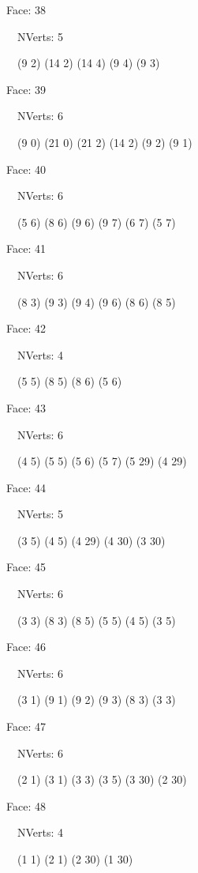 \documentclass{article}
\begin{document}
{\footnotesize 

Face: 38

\   \    NVerts: 5

 \   \   (9 2) (14 2) (14 4) (9 4) (9 3)}

{\footnotesize 

Face: 39

\   \    NVerts: 6

 \   \   (9 0) (21 0) (21 2) (14 2) (9 2) (9 1)}

{\footnotesize 

Face: 40

\   \    NVerts: 6

 \   \   (5 6) (8 6) (9 6) (9 7) (6 7) (5 7)}

{\footnotesize 

Face: 41

\   \    NVerts: 6

 \   \   (8 3) (9 3) (9 4) (9 6) (8 6) (8 5)}

{\footnotesize 

Face: 42

\   \    NVerts: 4

 \   \   (5 5) (8 5) (8 6) (5 6)}

{\footnotesize 

Face: 43

\   \    NVerts: 6

 \   \   (4 5) (5 5) (5 6) (5 7) (5 29) (4 29)}

{\footnotesize 

Face: 44

\   \    NVerts: 5

 \   \   (3 5) (4 5) (4 29) (4 30) (3 30)}

{\footnotesize 

Face: 45

\   \    NVerts: 6

 \   \   (3 3) (8 3) (8 5) (5 5) (4 5) (3 5)}

{\footnotesize 

Face: 46

\   \    NVerts: 6

 \   \   (3 1) (9 1) (9 2) (9 3) (8 3) (3 3)}

{\footnotesize 

Face: 47

\   \    NVerts: 6

 \   \   (2 1) (3 1) (3 3) (3 5) (3 30) (2 30)}

{\footnotesize 

Face: 48

\   \    NVerts: 4

 \   \   (1 1) (2 1) (2 30) (1 30)}
\end{document}
